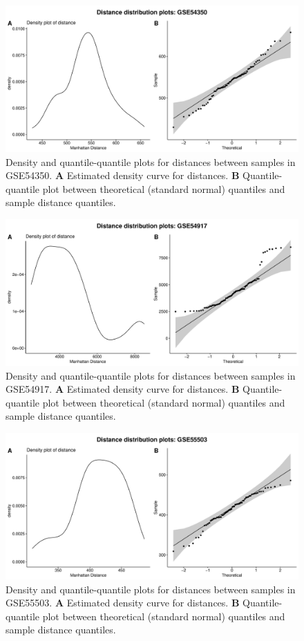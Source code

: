 \documentclass[10pt,letterpaper]{article}\usepackage[]{graphicx}\usepackage[]{color}
\begin{document}
\begin{figure}[H]
	\includegraphics[width=\textwidth]{manhattan-distance_hist_GSE54350.pdf}
	\caption{Density and quantile-quantile plots for distances between samples in GSE54350. \textbf{A} Estimated density curve for distances. \textbf{B} Quantile-quantile plot between theoretical (standard normal) quantiles and sample distance quantiles.}
\end{figure}

\begin{figure}[H]
	\includegraphics[width=\textwidth]{manhattan-distance_hist_GSE54917.pdf}
	\caption{Density and quantile-quantile plots for distances between samples in GSE54917. \textbf{A} Estimated density curve for distances. \textbf{B} Quantile-quantile plot between theoretical (standard normal) quantiles and sample distance quantiles.}
\end{figure}

\begin{figure}[H]
	\includegraphics[width=\textwidth]{manhattan-distance_hist_GSE55503.pdf}
	\caption{Density and quantile-quantile plots for distances between samples in GSE55503. \textbf{A} Estimated density curve for distances. \textbf{B} Quantile-quantile plot between theoretical (standard normal) quantiles and sample distance quantiles.}
\end{figure}
\end{document}
